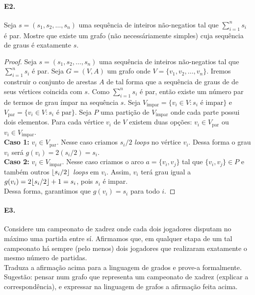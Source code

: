 \documentclass[11pt,a4paper,notitlepage]{exam}
\DeclarePairedDelimiter{\floor}{\lfloor}{\rfloor}
\begin{document}
\paragraph*{E2.} Seja $s = (s_1, s_2, \dots, s_n)$ uma sequência de inteiros não-negatios tal que $\sum_ {i=1}^n s_i$ é par. Mostre que existe um grafo (não necessáriamente simples) cuja sequência de graus é exatamente $s$.
\begin{proof}
  Seja $s = (s_1, s_2, \dots, s_n)$ uma sequência de inteiros não-negatios tal que $\sum_ {i=1}^n s_i$ é par. Seja $G = (V, A)$ um grafo onde $V = \{v_1, v_2, \dots, v_n\}$. Iremos construir o conjunto de arestas $A$ de tal forma que a sequência de graus de de seus vértices coincida com $s$. Como $\sum_ {i=1}^n s_i$ é par, então existe um número par de termos de grau ímpar na sequência $s$. Seja $V_{\text{impar}} = \{v_i \in V : s_i \text{ é impar}\}$ e $V_{\text{par}} = \{v_i \in V : s_i \text{ é par}\}$. Seja $P$ uma partição de $V_{\text{impar}}$ onde cada parte possui dois elementos. Para cada vértice $v_i$ de $V$ existem duas opções: $v_i \in V_{\text{par}}$ ou $v_i \in V_{\text{impar}}$.\\
  \textbf{Caso 1:} $v_i \in V_{\text{par}}$. Nesse caso criamos $s_i/2$ \textit{loops} no vértice $v_i$. Dessa forma o grau $v_i$ será $g(v_i) = 2(s_i/2) = s_i$.\\
  \textbf{Caso 2:} $v_i \in V_{\text{impar}}$. Nesse caso criamos o arco $a = \{v_i, v_j\}$ tal que $\{v_i, v_j\} \in P$ e também outros $\floor{s_i/2}$ \textit{loops} em $v_i$. Assim, $v_i$ terá grau igual a $g(v_i) = 2\floor{s_i/2} + 1 = s_i$, pois $s_i$ é impar.\\
  Dessa forma, garantimos que $g(v_i) = s_i$ para todo $i$.
\end{proof}

\paragraph*{E3.} Considere um campeonato de xadrez onde cada dois jogadores disputam no máximo uma partida entre sí. Afirmamos que, em qualquer etapa de um tal campeonato há sempre (pelo menos) dois jogadores que realizaram exatamente o mesmo número de partidas.\\
Traduza a afirmação acima para a linguagem de grados e prove-a formalmente. Sugestão: pensar num grafo que representa um campeonato de xadrez (explicar a correspondência), e expressar na linguagem de grafos a afirmação feita acima.\\
\end{document}
